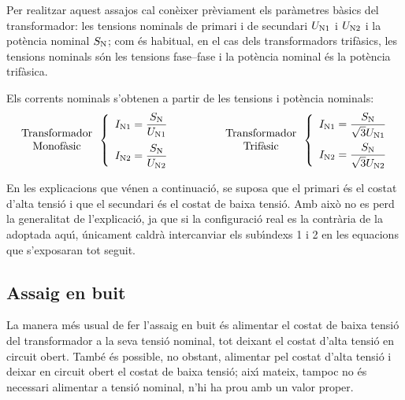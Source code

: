 Per realitzar aquest assajos cal con\`{e}ixer pr\`{e}viament els par\`{a}metres
b\`{a}sics del transformador: les tensions nominals de primari i de
secundari $U_\mathrm{N1}$ i $U_\mathrm{N2}$ i la pot\`{e}ncia nominal
$S_\mathrm{N}$; com \'{e}s habitual, en el cas dels transformadors
trif\`{a}sics, les tensions nominals s\'{o}n les tensions fase--fase i la
pot\`{e}ncia nominal \'{e}s la pot\`{e}ncia trif\`{a}sica.

Els corrents nominals s'obtenen a partir de les tensions i pot\`{e}ncia
nominals:
\begin{equation}
\begin{array}{c}\text{Transformador}\\
\text{Monof\`{a}sic}
\end{array} \left\{
\begin{array}{l}
   I_\mathrm{N1} = \dfrac{S_\mathrm{N}}{U_\mathrm{N1}} \\[2.7ex]
   I_\mathrm{N2} = \dfrac{S_\mathrm{N}}{U_\mathrm{N2}}
\end{array}
\right. \qquad\qquad
\begin{array}{c}\text{Transformador}\\
\text{Trif\`{a}sic}
\end{array} \left\{
\begin{array}{l}
   I_\mathrm{N1} = \dfrac{S_\mathrm{N}}{\sqrt{3}U_\mathrm{N1}} \\[2.5ex]
   I_\mathrm{N2} = \dfrac{S_\mathrm{N}}{\sqrt{3}U_\mathrm{N2}}
\end{array}
\right.
\end{equation}

En les explicacions que v\'{e}nen a continuaci\'{o}, se suposa que el
primari \'{e}s el costat d'alta tensi\'{o} i que el secundari \'{e}s el costat
de baixa tensi\'{o}. Amb aix\`{o} no es perd la generalitat de
l'explicaci\'{o}, ja que si la configuraci\'{o} real es la contr\`{a}ria de la
adoptada aqu\'{\i}, \'{u}nicament caldr\`{a} intercanviar els sub\'{\i}ndexs 1 i 2 en
les equacions que s'exposaran tot seguit.

\subsection{Assaig en buit}

La manera m\'{e}s usual de fer l'assaig en buit \'{e}s alimentar el costat
de baixa tensi\'{o} del transformador a  la seva tensi\'{o} nominal, tot
deixant el costat d'alta tensi\'{o} en circuit obert. Tamb\'{e} \'{e}s possible,
no obstant, alimentar pel costat d'alta tensi\'{o} i deixar en circuit
obert el costat de baixa tensi\'{o}; aix\'{\i} mateix, tampoc no \'{e}s necessari
alimentar a tensi\'{o} nominal, n'hi ha prou amb un valor proper.

